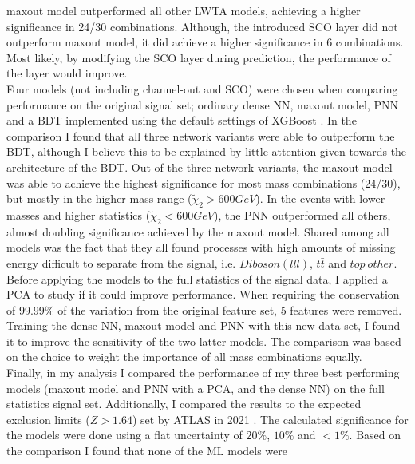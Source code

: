 maxout model outperformed all other \ac{LWTA} models, achieving a higher significance in 24/30 combinations. Although, the introduced \ac{SCO} layer did not outperform maxout model, it did achieve a higher significance in 6 
combinations. Most likely, by modifying the \ac{SCO} layer during prediction, the performance of the layer would improve.
\\\newline
Four models (not including channel-out and \ac{SCO}) were chosen when comparing performance on the original signal set; ordinary dense \ac{NN}, maxout model, \ac{PNN} and a \ac{BDT} implemented using the default settings of XGBoost \cite{XGB}. In the comparison I found that 
all three network variants were able to outperform the \ac{BDT}, although I believe this to be explained by little attention given towards the architecture of the \ac{BDT}. Out of the three network variants, the maxout model was able to achieve 
the highest significance for most mass combinations (24/30), but mostly in the higher mass range ($\tilde{\chi}_2>600GeV$). In the events with lower masses and higher statistics ($\tilde{\chi}_2<600GeV$), the \ac{PNN} outperformed all others, 
almost doubling significance achieved by the maxout model. Shared among all models was the fact that they all found processes with high amounts of missing energy difficult to separate from the signal, i.e. $Diboson(lll)$, $t\bar{t}$ and $top\ other$.
\\\newline
Before applying the models to the full statistics of the signal data, I applied a \ac{PCA} to study if it could improve performance. When requiring the conservation of $99.99\%$ of the variation from the original feature set, 5 features were removed.
Training the dense \ac{NN}, maxout model and \ac{PNN} with this new data set, I found it to improve the sensitivity of the two latter models. The comparison was based on the choice to weight the importance of all mass combinations equally.
\\\newline
Finally, in my analysis I compared the performance of my three best performing models (maxout model and \ac{PNN} with a \ac{PCA}, and the dense \ac{NN}) on the full statistics signal set. Additionally, I compared the results to the expected exclusion 
limits ($Z>1.64$) set by \ac{ATLAS} in 2021 \cite{atlas_search_2021}. The calculated significance for the models were done using a flat uncertainty of $20\%$, $10\%$ and $<1\%$. Based on the comparison I found that none of the \ac{ML} models were 
